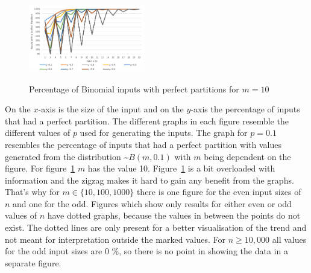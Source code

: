 \begin{figure}[h]
      \caption{Percentage of Binomial inputs with perfect partitions for $m = 10$}
      \centering
      \includegraphics[width=0.45\textwidth]{figures/images/solvabilityOfInputs/binomial_Input_Solvable_m10.png}\label{fig:firstBinPercentage}
\end{figure}

On the $x$-axis is the size of the input and on the $y$-axis the percentage of inputs that had a perfect partition.
The different graphs in each figure resemble the different values of $p$ used for generating the inputs.
The graph for $p=0.1$ resembles the percentage of inputs that had a perfect partition with values generated from the distribution \textasciitilde$B(m,0.1)$ with $m$ being dependent on the figure.
For figure~\ref{fig:firstBinPercentage} $m$ has the value 10.\newline
Figure~\ref{fig:firstBinPercentage} is a bit overloaded with information and the zigzag makes it hard to gain any benefit from the graphs.
That's why for $m \in \{10,100,1000\}$ there is one figure for the even input sizes of $n$ and one for the odd.
Figures which show only results for either even or odd values of $n$ have dotted graphs, because the values in between the points do not exist.
The dotted lines are only present for a better visualisation of the trend and not meant for interpretation outside the marked values.
For $n\ge10,000$ all values for the odd input sizes are 0 \%, so there is no point in showing the data in a separate figure.

